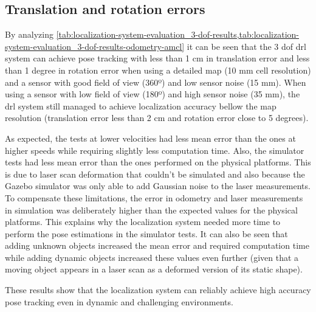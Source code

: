\subsection{Translation and rotation errors}

By analyzing \cref{tab:localization-system-evaluation_3-dof-results,tab:localization-system-evaluation_3-dof-results-odometry-amcl} it can be seen that the 3 \gls{dof} \gls{drl} system can achieve pose tracking with less than 1 cm in translation error and less than 1 degree in rotation error when using a detailed map (10 mm cell resolution) and a sensor with good field of view (360º) and low sensor noise (15 mm). When using a sensor with low field of view (180º) and high sensor noise (35 mm), the \gls{drl} system still managed to achieve localization accuracy bellow the map resolution (translation error less than 2 cm and rotation error close to 5 degrees).

As expected, the tests at lower velocities had less mean error than the ones at higher speeds while requiring slightly less computation time. Also, the simulator tests had less mean error than the ones performed on the physical platforms. This is due to laser scan deformation that couldn't be simulated and also because the Gazebo simulator was only able to add Gaussian noise to the laser measurements. To compensate these limitations, the error in odometry and laser measurements in simulation was deliberately higher than the expected values for the physical platforms. This explains why the localization system needed more time to perform the pose estimations in the simulator tests. It can also be seen that adding unknown objects increased the mean error and required computation time while adding dynamic objects increased these values even further (given that a moving object appears in a laser scan as a deformed version of its static shape).

These results show that the localization system can reliably achieve high accuracy pose tracking even in dynamic and challenging environments.

